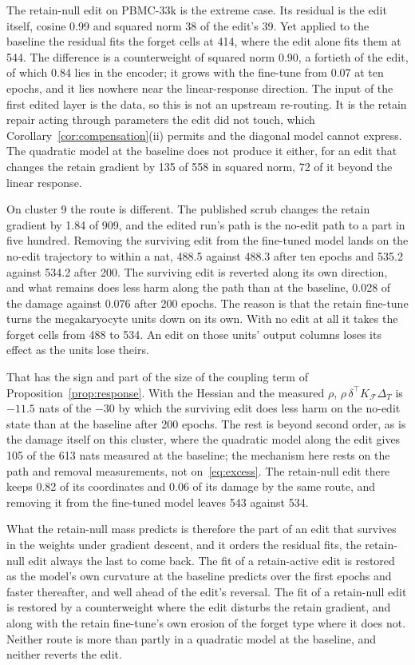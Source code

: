 \documentclass{article}
\begin{document}
The retain-null edit on PBMC-33k is the extreme case. Its residual is the edit itself, cosine 0.99 and squared norm 38 of the edit's 39. Yet applied to the baseline the residual fits the forget cells at 414, where the edit alone fits them at 544. The difference is a counterweight of squared norm 0.90, a fortieth of the edit, of which 0.84 lies in the encoder; it grows with the fine-tune from 0.07 at ten epochs, and it lies nowhere near the linear-response direction. The input of the first edited layer is the data, so this is not an upstream re-routing. It is the retain repair acting through parameters the edit did not touch, which Corollary~\ref{cor:compensation}(ii) permits and the diagonal model cannot express. The quadratic model at the baseline does not produce it either, for an edit that changes the retain gradient by 135 of 558 in squared norm, 72 of it beyond the linear response.

On cluster 9 the route is different. The published scrub changes the retain gradient by 1.84 of 909, and the edited run's path is the no-edit path to a part in five hundred. Removing the surviving edit from the fine-tuned model lands on the no-edit trajectory to within a nat, 488.5 against 488.3 after ten epochs and 535.2 against 534.2 after 200. The surviving edit is reverted along its own direction, and what remains does less harm along the path than at the baseline, 0.028 of the damage against 0.076 after 200 epochs. The reason is that the retain fine-tune turns the megakaryocyte units down on its own. With no edit at all it takes the forget cells from 488 to 534. An edit on those units' output columns loses its effect as the units lose theirs.

That has the sign and part of the size of the coupling term of Proposition~\ref{prop:response}. With the Hessian and the measured $\rho$, $\rho\,\delta^\top K_{\mathcal{F}} \Delta_T$ is $-11.5$ nats of the $-30$ by which the surviving edit does less harm on the no-edit state than at the baseline after 200 epochs. The rest is beyond second order, as is the damage itself on this cluster, where the quadratic model along the edit gives 105 of the 613 nats measured at the baseline; the mechanism here rests on the path and removal measurements, not on~\eqref{eq:excess}. The retain-null edit there keeps 0.82 of its coordinates and 0.06 of its damage by the same route, and removing it from the fine-tuned model leaves 543 against 534.

What the retain-null mass predicts is therefore the part of an edit that survives in the weights under gradient descent, and it orders the residual fits, the retain-null edit always the last to come back. The fit of a retain-active edit is restored as the model's own curvature at the baseline predicts over the first epochs and faster thereafter, and well ahead of the edit's reversal. The fit of a retain-null edit is restored by a counterweight where the edit disturbs the retain gradient, and along with the retain fine-tune's own erosion of the forget type where it does not. Neither route is more than partly in a quadratic model at the baseline, and neither reverts the edit.
\end{document}
